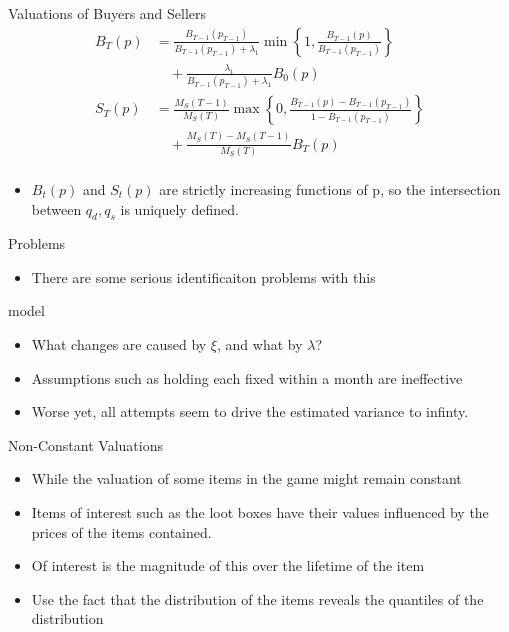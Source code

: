 \documentclass[bigger]{beamer}
\begin{document}
\begin{frame}[label=sec-1-19]{Valuations of Buyers and Sellers}
\begin{align*}
B_T (p) &= \frac{ B_{T-1 }(p_{T-1}) }{ B_{T-1 }(p_{T-1}) + \lambda_1 } \min \left \{ 1, \frac{ B_{T-1} ( p ) }{B_{T-1 }(p_{T-1 })} \right \}\\
 & \quad + \frac{ \lambda_1 }{ B_{T-1 }(p_{T-1}) + \lambda_1 } B_0 (p) \\
S_T (p) &= \frac{ M_S(T-1) }{ M_S(T) } \max \left \{ 0, \frac{ B_{T-1}(p) - B_{T-1}( p_{T-1} ) }{ 1 - B_{T-1} ( p_{T-1} ) } \right \}\\
 & \quad + \frac{ M_S(T) - M_S(T-1)_{} }{M_S(T)} B_T (p)\\
\end{align*}


\begin{itemize}
\item $B_t(p)$ and $S_t(p)$ are strictly increasing functions of p, so the
intersection between $q_d, q_s$ is uniquely defined.
\end{itemize}
\end{frame}
\begin{frame}[label=sec-1-20]{Problems}
\begin{itemize}
\item There are some serious identificaiton problems with this
\end{itemize}
model
\begin{itemize}
\item What changes are caused by $\xi$, and what by $\lambda$?
\item Assumptions such as holding each fixed within a month are
ineffective
\item Worse yet, all attempts seem to drive the estimated variance to infinty.
\end{itemize}
\end{frame}

\begin{frame}[label=sec-1-21]{Non-Constant Valuations}
\begin{itemize}
\item While the valuation of some items in the game might remain constant
\item Items of interest such as the loot boxes have their values
influenced by the prices of the items contained.
\item Of interest is the magnitude of this over the lifetime of the item
\item Use the fact that the distribution of the items reveals the
quantiles of the distribution
\end{itemize}
\end{frame}
\end{document}
